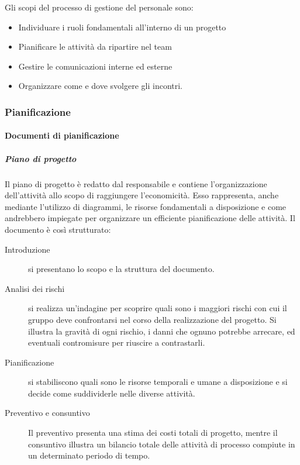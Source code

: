 \documentclass[../norme-di-progetto.tex]{subfiles}
\begin{document}
Gli scopi del processo di gestione del personale sono:

\begin{itemize}
  \item Individuare i ruoli fondamentali all'interno di un progetto
  \item Pianificare le attività da ripartire nel team
  \item Gestire le comunicazioni interne ed esterne
  \item Organizzare come e dove svolgere gli incontri.
\end{itemize}

\subsubsection{Pianificazione}%
\label{subs:pianificazione}

\paragraph{Documenti di pianificazione}%
\label{par:documenti_di_pianificazione}

\subparagraph{Piano di progetto}%
\label{subp:piano_di_progetto}
Il piano di progetto è redatto dal responsabile e contiene l'organizzazione dell'attività allo scopo di raggiungere l'economicità. Esso rappresenta, anche mediante l'utilizzo di diagrammi, le risorse fondamentali a disposizione e come andrebbero impiegate per organizzare un efficiente pianificazione delle attività. Il documento è così strutturato:
\begin{description}
  \item [Introduzione] si presentano lo scopo e la struttura del documento.
  \item [Analisi dei rischi] si realizza un'indagine per scoprire quali sono i maggiori rischi con cui il gruppo deve confrontarsi nel corso della realizzazione del progetto. Si illustra la gravità di ogni rischio, i danni che ognuno potrebbe arrecare, ed eventuali contromisure per riuscire a contrastarli.
  \item [Pianificazione] si stabiliscono quali sono le risorse temporali e umane a disposizione e si decide come suddividerle nelle diverse attività.
  \item [Preventivo e consuntivo] Il preventivo presenta una stima dei costi totali di progetto, mentre il consuntivo illustra un bilancio totale delle attività di processo compiute in un determinato periodo di tempo.
\end{description}
\end{document}

